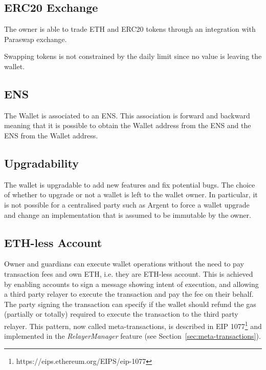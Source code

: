 \documentclass[12pt]{article}
\begin{document}
\subsection{ERC20 Exchange}

The owner is able to trade ETH and ERC20 tokens through an integration with Paraswap exchange.

Swapping tokens is not constrained by the daily limit since no value is leaving the wallet.

\subsection{ENS}

The Wallet is associated to an ENS. This association is forward and backward meaning that it is possible to obtain the Wallet address from the ENS and the ENS from the Wallet address.

\subsection{Upgradability}

The wallet is upgradable to add new features and fix potential bugs. The choice of whether to upgrade or not a wallet is left to the wallet owner. In particular, it is not possible for a centralised party such as Argent to force a wallet upgrade and change an implementation that is assumed to be immutable by the owner.

\subsection{ETH-less Account}
\label{sec:eth-less-account}

Owner and guardians can execute wallet operations without the need to pay transaction fees and own ETH, i.e. they are ETH-less account. This is achieved by enabling accounts to sign a message showing intent of execution, and allowing a third party relayer to execute the transaction and pay the fee on their behalf. The party signing the transaction can specify if the wallet should refund the gas (partially or totally) required to execute the transaction to the third party relayer. This pattern, now called meta-transactions, is described in EIP 1077\footnote{https://eips.ethereum.org/EIPS/eip-1077} and implemented in the \emph{RelayerManager} feature (see Section~\ref{sec:meta-transactions}). 
\end{document}
